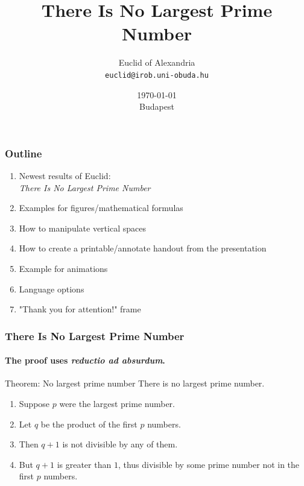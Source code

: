\documentclass[aspectratio=169]{beamer}
\title[No Largest Prime Number]{There Is No Largest Prime Number} %
\date{\today \\ Budapest} %
\author[Euclid]{Euclid of Alexandria \\ \texttt{euclid@irob.uni-obuda.hu}  } %
\begin{document}
	
	\begin{frame}
		\titlepage
	\end{frame}
	
	\begin{frame}
		\frametitle{Outline}
		
		\begin{enumerate}
			\item Newest results of Euclid: \\	\textit{There Is No Largest Prime Number}
				
				\vspace{3mm}
				
			\item Examples for figures/mathematical formulas
			
				\vspace{3mm}
				
			\item How to manipulate vertical spaces
			
				\vspace{3mm}
			
			\item How to create a printable/annotate handout from the presentation
			
				\vspace{3mm}
			
			\item Example for animations
			
				\vspace{3mm}
				
			\item Language options
			
				\vspace{3mm}
			
			\item "Thank you for attention!" frame
		\end{enumerate}
	\end{frame}
	
	\begin{frame} 
		\frametitle{There Is No Largest Prime Number} 
		\framesubtitle{The proof uses \textit{reductio ad absurdum}.} 
		\begin{block}{Theorem: No largest prime number}
			There is no largest prime number. 
		\end{block} 
		\begin{enumerate} 
			\item<1-| alert@1> Suppose $p$ were the largest prime number. 
			\item<2-> Let $q$ be the product of the first $p$ numbers. 
			\item<3-> Then $q+1$ is not divisible by any of them. 
			\item<4-> But $q + 1$ is greater than $1$, thus divisible by some prime
			number not in the first $p$ numbers.
		\end{enumerate}
	\end{frame}
	
\end{document}
